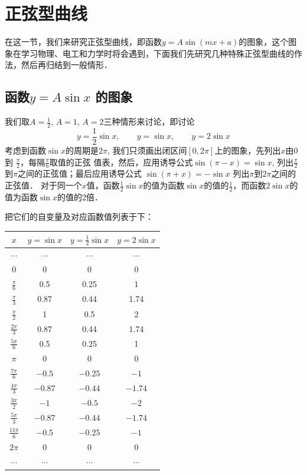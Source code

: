 \section{正弦型曲线}
在这一节，我们来研究正弦型曲线，即函数$y=A\sin(mx+a)$的图象，这个图象在学习物理、电工和力学时将会遇到，下面我们先研究几种特殊正弦型曲线的作法，然后再归结到一般情形．

\subsection{函数$y=A\sin x$ 的图象}

我们取$A=\frac{1}{2}$, $A=1$, $A=2$三种情形来讨论，即讨论
\[y=\frac{1}{2}\sin x,\qquad  y=\sin x,\qquad  y=2\sin x\]
考虑到函数$\sin x$的周期是$2\pi$, 我们只须画出闭区间$[0,
2\pi]$上的图象，先列出$x$由0到
$\frac{\pi}{2}$，每隔$\frac{\pi}{6}$取值的正弦
值表，然后，应用诱导公式$\sin(\pi-x)=\sin x$,
列出$\frac{\pi}{2}$
到$\pi$之间的正弦值；最后应用诱导公式
$\sin (\pi+x) =-\sin x$
列出$\pi$到$2\pi$之间的正弦值．
对于同一个$x$值，函数$\frac{1}{2}\sin x$的值为函数$\sin x$的值的$\frac{1}{2}$，而函数$2\sin x$的值为函数$\sin x$的值的2倍．

把它们的自变量及对应函数值列表于下：
\begin{center}
\begin{tabular}{cccc}
    \hline
$x$ & $y=\sin x$ & $y=\tfrac{1}{2}\sin x$ & $y=2\sin x$\\
\hline
$\cdots$ & $\cdots$&$\cdots$&$\cdots$\\
$0$   &    0   &   0 &  0\\
$\tfrac{\pi}{6}$   &    0.5   &   0.25 &  1\\
$\tfrac{\pi}{3}$   &    0.87   &   0.44 &  1.74\\
$\tfrac{\pi}{2}$   &    1   &   0.5 &  2\\
$\tfrac{2\pi}{3}$   &    0.87   &   0.44 &  1.74\\
$\tfrac{5\pi}{6}$   &    0.5   &   0.25 &  1\\
$\pi$   &    0   &   0 &  0\\
$\tfrac{7\pi}{6}$   &    $-0.5$   &   $-0.25$ &  $-1$\\
$\tfrac{4\pi}{3}$   &    $-0.87$   &   $-0.44$ &  $-1.74$\\
$\tfrac{3\pi}{2}$   &    $-1$   &   $-0.5$ &  $-2$\\
$\tfrac{5\pi}{3}$   &    $-0.87$   &   $-0.44$ &  $-1.74$\\
$\tfrac{11\pi}{6}$   &    $-0.5$   &   $-0.25$ &  $-1$\\
$2\pi$   &    0   &   0 &  0\\
$\cdots$ & $\cdots$&$\cdots$&$\cdots$\\
\hline
\end{tabular}
\end{center}

